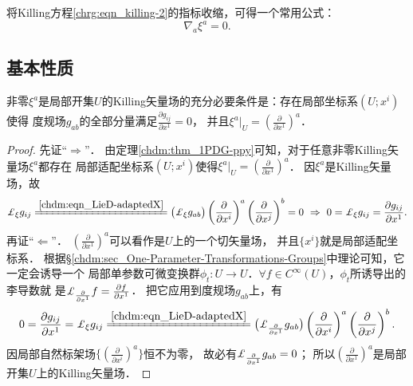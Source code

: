 将Killing方程\eqref{chrg:eqn_killing-2}的指标收缩，可得一个常用公式：
\begin{equation}\label{chrg:eqn_nk=0}
    {\nabla_a} \xi^a = 0 .
\end{equation}

\subsection{基本性质}
\begin{theorem}\label{chrg:thm_killing-partial-x1}
    非零$\xi^a$是局部开集$U$的Killing矢量场的充分必要条件是：存在局部坐标系$(U;x^i)$使得
    度规场$g_{ab}$的全部分量满足$\frac{\partial g_{ij}}{\partial x^1}=0$，
    并且$\xi^a |_U = (\frac{\partial }{\partial x^1} )^a$．
\end{theorem}
\begin{proof}
    先证“$\Rightarrow$”．
    由定理\ref{chdm:thm_1PDG-ppy}可知，对于任意非零Killing矢量场$\xi^a$都存在
    局部{\kaishu 适配坐标系}$(U;x^i)$使得$\xi^a |_U = (\frac{\partial }{\partial x^1} )^a$．
    因$\xi^a$是Killing矢量场，故 %
    \begin{equation}
        \Lie_{\xi} g_{ij}  \xlongequal{\ref{chdm:eqn_LieD-adaptedX}}
        \bigl(\Lie_{\xi} g_{ab}\bigr)
        \left(\frac{\partial }{\partial x^i} \right)^a \left(\frac{\partial }{\partial x^j} \right)^b=0
         \ \Rightarrow \ 
        0=\Lie_{\xi} g_{ij}= \frac{\partial g_{ij}}{\partial x^1}.
    \end{equation}
    再证“$\Leftarrow$”．
    $\left(\frac{\partial }{\partial x^1}\right)^a$可以看作是$U$上的一个切矢量场，
    并且$\{x^i\}$就是局部{\kaishu 适配坐标系}．
    根据\S\ref{chdm:sec_One-Parameter-Transformations-Groups}中理论可知，它一定会诱导一个
    局部单参数可微变换群$\phi_t:U\to U$．$\forall f\in C^\infty(U)$，$\phi_t$所诱导出的李导数就
    是$\Lie_{\frac{\partial }{\partial x^1}} f= \frac{\partial f}{\partial x^1}$．
    把它应用到度规场$g_{ab}$上，有
    \begin{equation}
        0= \frac{\partial g_{ij}}{\partial x^1} = \Lie_{\xi} g_{ij}
        \xlongequal{\ref{chdm:eqn_LieD-adaptedX}}
        \bigl(\Lie_{\frac{\partial }{\partial x^1}} g_{ab}\bigr)
        \left(\frac{\partial }{\partial x^i} \right)^a
        \left(\frac{\partial }{\partial x^j} \right)^b .
    \end{equation}
    因局部自然标架场$\{\left(\frac{\partial }{\partial x^i} \right)^a\}$恒不为零，
    故必有$\Lie_{\frac{\partial }{\partial x^1}} g_{ab}=0$；
    所以$\left(\frac{\partial }{\partial x^1}\right)^a$是局部开集$U$上的Killing矢量场．
\end{proof}


